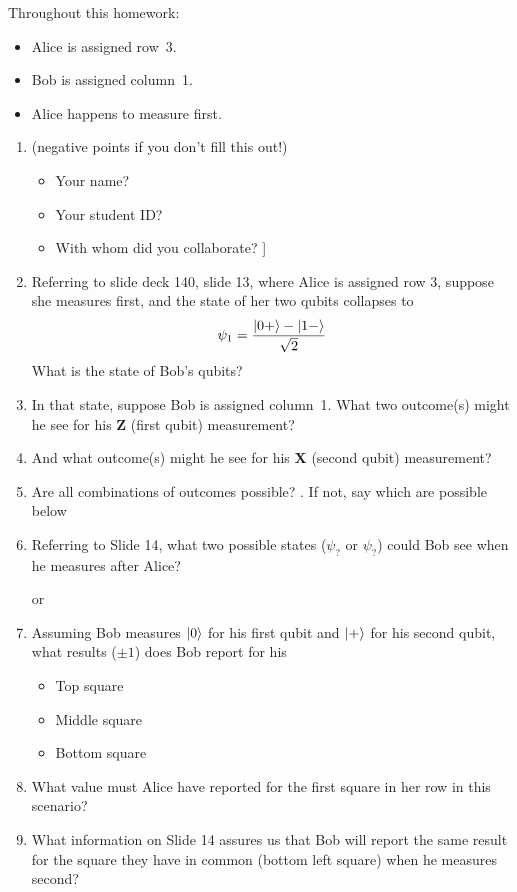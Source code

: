 \documentclass[12pt]{article}
\begin{document}
Throughout this homework:
\begin{itemize}
    \item Alice is assigned row~3.
    \item Bob is assigned column~1.  
    \item Alice happens to measure first.
    \end{itemize}
\begin{enumerate}[font=\bfseries]
\item {} (negative points if you don't fill this out!)
\begin{itemize}
    \item Your name?
    \item Your student ID?
    \item With whom did you collaborate?
    \LeaveSpace{}]
\end{itemize}
    \item {} Referring to slide deck 140, slide 13, where Alice is assigned row 3, suppose she measures first, and the state of her two qubits collapses to \[ \psi_{1}=\frac{\ket{0+}-\ket{1-}}{\sqrt{2}} \]
    What is the state of Bob's qubits? \Blank[2in]
    
    \item {} In that state, suppose Bob is assigned column~1.  What two outcome(s) might he see for his \textbf{Z} (first qubit) measurement?
    
    \Blank[2in]
    \item {} And what outcome(s) might he see for his \textbf{X} (second qubit) measurement?
    
    \Blank[2in]
    
    \item {} Are all combinations of outcomes possible?  \Blank{}.  If not, say which are possible below
    
    \Blank[2in]{}
    \item {} Referring to Slide 14, what two possible states ($\psi_{?}$ or $\psi_{?}$) could Bob see when he measures after Alice?
    
    \Blank{} or \Blank{}
    \item {} Assuming Bob measures $\ket{0}$ for his first qubit and $\ket{+}$ for his second qubit, what results ($\pm 1$) does Bob report for his
    \begin{itemize}
        \item Top square \Blank{}
        \item Middle square \Blank{}
        \item Bottom square \Blank{}
    \end{itemize}
    \item {} What value must Alice have reported for the first square in her row in this scenario? \Blank{}
    \item {} What information on Slide 14 assures us that Bob will report the same result for the square they have in common (bottom left square) when he measures second?
    
\end{enumerate}
\end{document}
